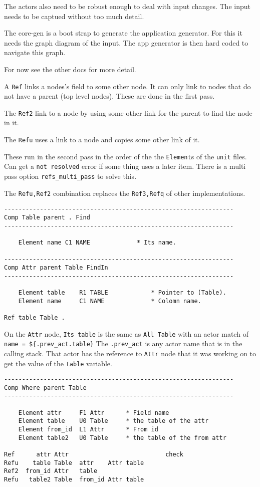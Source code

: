 \documentclass[11pt]{article}
\begin{document}
The actors also need to be robust enough to deal with input changes. The
input needs to be captued without too much detail.

The core-gen is a boot strap to generate the application generator. For
this it needs the graph diagram of the input. The app generator is then
hard coded to navigate this graph.

For now see the other docs for more detail.

A \texttt{Ref} links a nodes's field to some other node. It can only
link to nodes that do not have a parent (top level nodes). These are
done in the first pass.

The \texttt{Ref2} link to a node by using some other link for the parent
to find the node in it.

The \texttt{Refu} uses a link to a node and copies some other link of
it.

These run in the second pass in the order of the the \texttt{Element}s
of the \texttt{unit} files. Can get a \texttt{not\ resolved} error if
some thing uses a later item. There is a multi pass option
\texttt{refs\_multi\_pass} to solve this.

The \texttt{Refu,Ref2} combination replaces the \texttt{Ref3,Refq} of
other implementations.

\begin{verbatim}
----------------------------------------------------------------
Comp Table parent . Find
----------------------------------------------------------------

    Element name C1 NAME             * Its name.

----------------------------------------------------------------
Comp Attr parent Table FindIn
----------------------------------------------------------------

    Element table    R1 TABLE            * Pointer to (Table).
    Element name     C1 NAME             * Colomn name.

Ref table Table .
\end{verbatim}

On the \texttt{Attr} node, \texttt{Its\ table} is the same as
\texttt{All\ Table} with an actor match of
\texttt{name\ =\ \$\{.prev\_act.table\}} The \texttt{.prev\_act} is any
actor name that is in the calling stack. That actor has the reference to
\texttt{Attr} node that it was working on to get the value of the
\texttt{table} variable.

\begin{verbatim}
----------------------------------------------------------------
Comp Where parent Table
----------------------------------------------------------------

    Element attr     F1 Attr      * Field name
    Element table    U0 Table     * the table of the attr
    Element from_id  L1 Attr      * From id
    Element table2   U0 Table     * the table of the from attr

Ref      attr Attr                           check
Refu    table Table  attr    Attr table
Ref2  from_id Attr   table
Refu   table2 Table  from_id Attr table
\end{verbatim}
\end{document}
